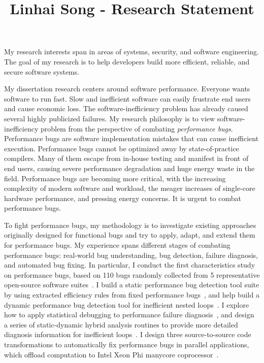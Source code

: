 \documentclass[10pt]{article}
\title{\vspace{-.7in}\bf{Linhai Song - Research Statement\vspace{-.4in}}}
\date{}
\begin{document}
\maketitle\vspace{-.2in}

My research interests span in areas of systems, security, and software engineering.
The goal of my research is to help developers build more efficient, reliable, and secure software systems.

My dissertation research centers around software performance. 
Everyone wants software to run fast. 
Slow and inefficient software can easily frustrate end users and cause economic loss. 
The software-inefficiency problem has already caused several highly publicized failures. 
My research philosophy is to view software-inefficiency problem from the perspective of combating \textit{performance bugs}.
Performance bugs are software implementation mistakes that can cause inefficient execution. 
Performance bugs cannot be optimized away by state-of-practice compilers.
Many of them escape from in-house testing and manifest in front of end users, 
causing severe performance degradation and huge energy waste in the field. 
Performance bugs are becoming more critical, with the increasing complexity of modern software and workload, 
the meager increases of single-core hardware performance, 
and pressing energy concerns. 
It is urgent to combat performance bugs.

To fight performance bugs, my methodology is to investigate existing approaches originally
designed for functional bugs and try to apply, adapt, and extend them
for performance bugs.
My experience spans different
stages of combating performance bugs: real-world bug understanding, bug detection,
failure diagnosis, and automated bug fixing.
In particular, I conduct the first characteristics study on performance bugs, based on 110 bugs 
randomly collected from 5 representative open-source software suites~\cite{jin12perfbug}.
I build a static performance bug detection tool suite by using extracted efficiency rules from fixed performance bugs~\cite{jin12perfbug}, 
and help build a dynamic performance bug detection tool for inefficient nested loops~\cite{Nistor13ICSE}. 
I explore how to apply statistical debugging to performance failure diagnosis~\cite{Song14OOPSLA}, 
and design a series of static-dynamic hybrid analysis routines to provide more detailed diagnosis information for inefficient loops~\cite{Song17ICSE}.
I design three source-to-source code transformations to automatically fix performance bugs in 
parallel applications, which offload computation to Intel Xeon Phi manycore coprocessor~\cite{Song14MICRO}. 
\end{document}
